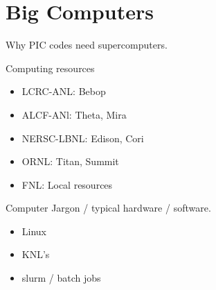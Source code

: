 \documentclass[professionalfonts,t]{beamer}
\begin{document}
\section{Big Computers}
\begin{frame}
	Why PIC codes need supercomputers.
\end{frame}

\begin{frame}
Computing resources
\begin{itemize}
	\item LCRC-ANL: Bebop
	\item ALCF-ANl: Theta, Mira
	\item NERSC-LBNL: Edison, Cori
	\item ORNL: Titan, Summit
	\item FNL: Local resources
\end{itemize}
\end{frame}

\begin{frame}
	Computer Jargon / typical hardware / software.
	\begin{itemize}
		\item Linux
		\item KNL's
		\item slurm / batch jobs
	\end{itemize}
\end{frame}
\end{document}
